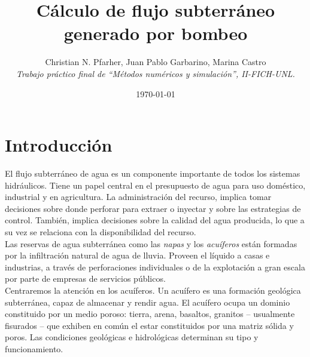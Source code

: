 \documentclass[10pt,a4paper,final]{article}
\begin{document}
\title{Cálculo de flujo subterráneo generado por bombeo}
\author{Christian N. Pfarher, Juan Pablo Garbarino, Marina Castro\\
\textit{Trabajo práctico final de ``Métodos numéricos y simulación'', II-FICH-UNL.}}
\date{\today}
\maketitle
\newpage
\tableofcontents
\newpage
\listoffigures %
\newpage
\listoftables %
\newpage
\section{Introducción}
El flujo subterráneo de agua es un componente importante de todos los sistemas hidráulicos. Tiene un papel central en el presupuesto de agua para uso doméstico, industrial y en agricultura. La administración del recurso, implica tomar decisiones sobre donde perforar para extraer o inyectar y sobre las estrategias de control. También, implica decisiones sobre la calidad del agua producida, lo que a su vez se relaciona con la disponibilidad del recurso.\\
Las reservas de agua subterránea como las \emph{napas} y los \emph{acuíferos} están formadas por la infiltración natural de agua de lluvia. Proveen el líquido a casas e industrias, a través de perforaciones individuales o de la explotación a gran escala por parte de empresas de servicios públicos.\\
Centraremos la atención en los acuíferos. Un acuífero es una formación geológica subterránea, capaz de almacenar y rendir agua. El acuífero ocupa un dominio constituido por un medio poroso: tierra, arena, basaltos, granitos – usualmente fisurados – que exhiben en común el estar constituidos por una matriz sólida y poros. Las condiciones geológicas e hidrológicas determinan su tipo y funcionamiento.
\end{document}

